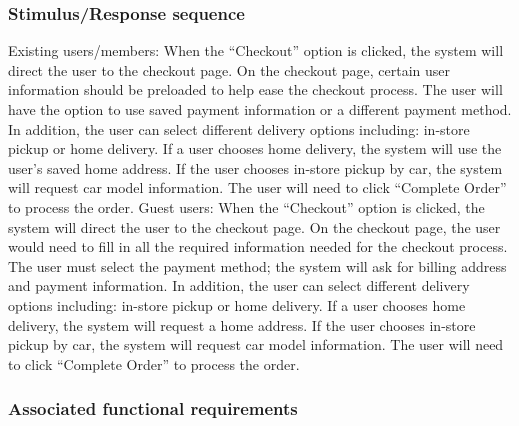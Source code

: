 \documentclass{scrreprt}
\theoremstyle{funreq}
\begin{document}
	\subsubsection{Stimulus/Response sequence}
	Existing users/members:
	When the “Checkout” option is clicked, the system will direct the user to the checkout page. On the checkout page, certain user information should be preloaded to help ease the checkout process. The user will have the option to use saved payment information or a different payment method. In addition, the user can select different delivery options including: in-store pickup or home delivery. If a user chooses home delivery, the system will use the user's saved home address. If the user chooses in-store pickup by car, the system will request car model information. The user will need to click “Complete Order” to process the order.
	Guest users: 
	When the “Checkout” option is clicked, the system will direct the user to the checkout page. On the checkout page, the user would need to fill in all the required information needed for the checkout process. The user must select the payment method; the system will ask for billing address and payment information. In addition, the user can select different delivery options including: in-store pickup or home delivery. If a user chooses home delivery, the system will request a home address. If the user chooses in-store pickup by car, the system will request car model information. The user will need to click “Complete Order” to process the order.
	
	
	\subsubsection{Associated functional requirements}
	
	
\end{document}
